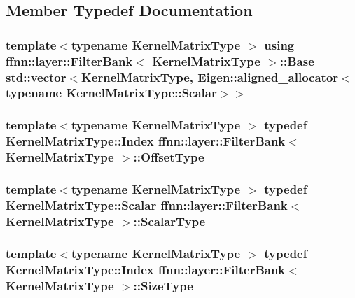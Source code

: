 \subsection{Member Typedef Documentation}
\hypertarget{classffnn_1_1layer_1_1_filter_bank_a57f78a46d30b55129334593d977d8c10}{
\subsubsection[{Base}]{\setlength{\rightskip}{0pt plus 5cm}template$<$typename Kernel\-Matrix\-Type $>$ using {\bf ffnn\-::layer\-::\-Filter\-Bank}$<$ Kernel\-Matrix\-Type $>$\-::{\bf Base} =  std\-::vector$<$Kernel\-Matrix\-Type, Eigen\-::aligned\-\_\-allocator$<$typename Kernel\-Matrix\-Type\-::\-Scalar$>$$>$}}\label{classffnn_1_1layer_1_1_filter_bank_a57f78a46d30b55129334593d977d8c10}
\hypertarget{classffnn_1_1layer_1_1_filter_bank_a87d15738c0864b171f2b605af7330432}{
\subsubsection[{Offset\-Type}]{\setlength{\rightskip}{0pt plus 5cm}template$<$typename Kernel\-Matrix\-Type $>$ typedef Kernel\-Matrix\-Type\-::\-Index {\bf ffnn\-::layer\-::\-Filter\-Bank}$<$ Kernel\-Matrix\-Type $>$\-::{\bf Offset\-Type}}}\label{classffnn_1_1layer_1_1_filter_bank_a87d15738c0864b171f2b605af7330432}
\hypertarget{classffnn_1_1layer_1_1_filter_bank_a9520eb8417c9c124f33c1136d40842d4}{
\subsubsection[{Scalar\-Type}]{\setlength{\rightskip}{0pt plus 5cm}template$<$typename Kernel\-Matrix\-Type $>$ typedef Kernel\-Matrix\-Type\-::\-Scalar {\bf ffnn\-::layer\-::\-Filter\-Bank}$<$ Kernel\-Matrix\-Type $>$\-::{\bf Scalar\-Type}}}\label{classffnn_1_1layer_1_1_filter_bank_a9520eb8417c9c124f33c1136d40842d4}
\hypertarget{classffnn_1_1layer_1_1_filter_bank_afd78272ebca97ce2f34596ffb9dc6cd9}{
\subsubsection[{Size\-Type}]{\setlength{\rightskip}{0pt plus 5cm}template$<$typename Kernel\-Matrix\-Type $>$ typedef Kernel\-Matrix\-Type\-::\-Index {\bf ffnn\-::layer\-::\-Filter\-Bank}$<$ Kernel\-Matrix\-Type $>$\-::{\bf Size\-Type}}}\label{classffnn_1_1layer_1_1_filter_bank_afd78272ebca97ce2f34596ffb9dc6cd9}


